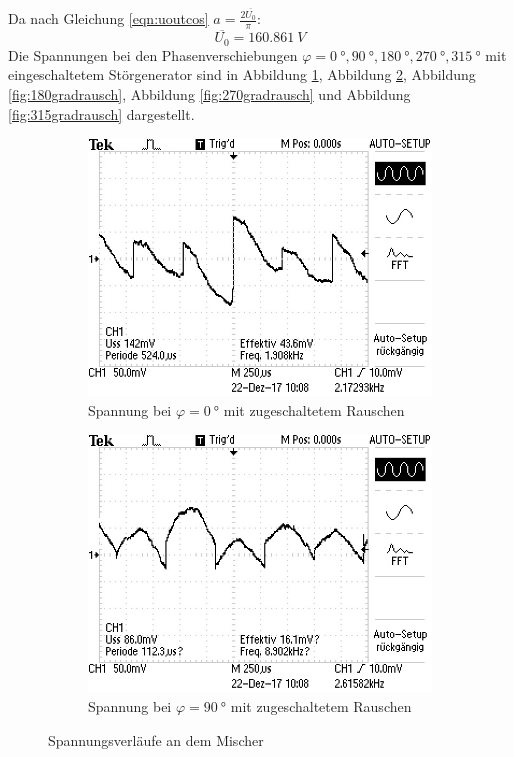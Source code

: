 Da nach Gleichung \eqref{eqn:uoutcos} $a=\frac{2 \overline{U_{0}}}{\pi}$:
\begin{equation*}
  \overline{U_{0}}= \SI{160.861}{V}
\end{equation*}
\FloatBarrier
Die Spannungen bei den Phasenverschiebungen $\varphi= \SI{0}{°}, \SI{90}{°}, \SI{180}{°}, \SI{270}{°}, \SI{315}{°}$ mit eingeschaltetem Störgenerator sind in Abbildung \ref{fig:0gradrausch},
Abbildung \ref{fig:90gradrausch}, Abbildung \ref{fig:180gradrausch}, Abbildung \ref{fig:270gradrausch} und Abbildung \ref{fig:315gradrausch} dargestellt.
\FloatBarrier
\begin{figure}[h!]
 \centering
 \begin{subfigure}{0.48\textwidth}
  \centering
  \includegraphics[width=\textwidth]{0gradrausch.JPG}
  \caption{Spannung bei $\varphi=\SI{0}{°}$ mit zugeschaltetem Rauschen}
  \label{fig:0gradrausch}
 \end{subfigure}
 \begin{subfigure}{0.48\textwidth}
  \centering
  \includegraphics[width=\textwidth]{90gradrausch.JPG}
  \caption{Spannung bei $\varphi=\SI{90}{°}$ mit zugeschaltetem Rauschen}
  \label{fig:90gradrausch}
 \end{subfigure}
 \caption{Spannungsverläufe an dem Mischer}
 \label{fig:000090}
\end{figure}
